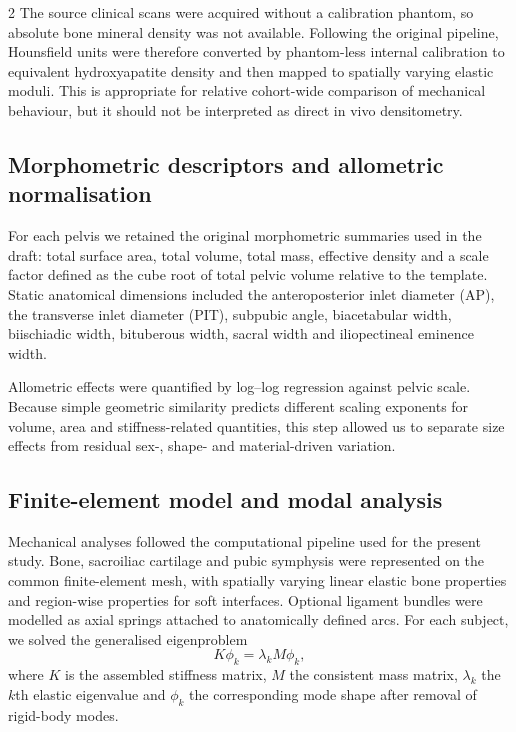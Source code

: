 \documentclass[openacc]{rsproca_new}
\begin{document}
\begin{multicols}{2}
The source clinical scans were acquired without a calibration phantom, so absolute bone mineral density was not available. Following the original pipeline, Hounsfield units were therefore converted by phantom-less internal calibration to equivalent hydroxyapatite density and then mapped to spatially varying elastic moduli. This is appropriate for relative cohort-wide comparison of mechanical behaviour, but it should not be interpreted as direct in vivo densitometry.

\subsection{Morphometric descriptors and allometric normalisation}

For each pelvis we retained the original morphometric summaries used in the draft: total surface area, total volume, total mass, effective density and a scale factor defined as the cube root of total pelvic volume relative to the template. Static anatomical dimensions included the anteroposterior inlet diameter (AP), the transverse inlet diameter (PIT), subpubic angle, biacetabular width, biischiadic width, bituberous width, sacral width and iliopectineal eminence width.

Allometric effects were quantified by log--log regression against pelvic scale. Because simple geometric similarity predicts different scaling exponents for volume, area and stiffness-related quantities, this step allowed us to separate size effects from residual sex-, shape- and material-driven variation.

\subsection{Finite-element model and modal analysis}

Mechanical analyses followed the computational pipeline used for the present study. Bone, sacroiliac cartilage and pubic symphysis were represented on the common finite-element mesh, with spatially varying linear elastic bone properties and region-wise properties for soft interfaces. Optional ligament bundles were modelled as axial springs attached to anatomically defined arcs. For each subject, we solved the generalised eigenproblem
\begin{equation}
K\phi_k = \lambda_k M\phi_k,
\end{equation}
where $K$ is the assembled stiffness matrix, $M$ the consistent mass matrix, $\lambda_k$ the $k$th elastic eigenvalue and $\phi_k$ the corresponding mode shape after removal of rigid-body modes.


\end{multicols}
\end{document}

